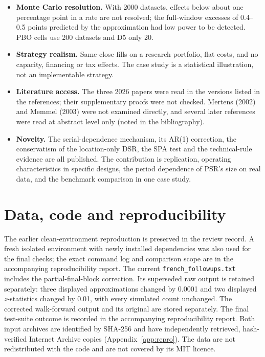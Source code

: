 \documentclass[11pt,a4paper]{article}
\begin{document}
\begin{itemize}
\item \textbf{Monte Carlo resolution.} With 2000 datasets, effects below about one percentage point in a rate are not resolved; the full-window excesses of 0.4--0.5 points predicted by the approximation had low power to be detected. PBO cells use 200 datasets and D5 only 20.
\item \textbf{Strategy realism.} Same-close fills on a research portfolio, flat costs, and no capacity, financing or tax effects. The case study is a statistical illustration, not an implementable strategy.
\item \textbf{Literature access.} The three 2026 papers were read in the versions listed in the references; their supplementary proofs were not checked. Mertens (2002) and Memmel (2003) were not examined directly, and several later references were read at abstract level only (noted in the bibliography).
\item \textbf{Novelty.} The serial-dependence mechanism, its AR(1) correction, the conservatism of the location-only DSR, the SPA test and the technical-rule evidence are all published. The contribution is replication, operating characteristics in specific designs, the period dependence of PSR's size on real data, and the benchmark comparison in one case study.
\end{itemize}

\section{Data, code and reproducibility}\label{sec:repro}

The earlier clean-environment reproduction is preserved in the review record. A fresh isolated environment with newly installed dependencies was also used for the final checks; the exact command log and comparison scope are in the accompanying reproducibility report. The current \texttt{french\_followups.txt} includes the partial-final-block correction. Its superseded raw output is retained separately: three displayed approximations changed by 0.0001 and two displayed $z$-statistics changed by 0.01, with every simulated count unchanged. The corrected walk-forward output and its original are stored separately. The final test-suite outcome is recorded in the accompanying reproducibility report. Both input archives are identified by SHA-256 and have independently retrieved, hash-verified Internet Archive copies (Appendix~\ref{app:repro}). The data are not redistributed with the code and are not covered by its MIT licence.
\end{document}
